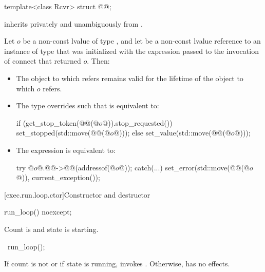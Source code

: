 \begin{itemdecl}
template<class Rcvr>
  struct @@;
\end{itemdecl}

\pnum
{}
inherits privately and unambiguously from .

\pnum
Let $o$ be a non-const lvalue of type ,
and let  be a non-const lvalue reference to an instance of type 
that was initialized with the expression 
passed to the invocation of connect that returned $o$.
Then:
\begin{itemize}
\item
The object to which  refers
remains valid for the lifetime of the object to which $o$ refers.
\item
The type  overrides
such that  is equivalent to:
\begin{codeblock}
if (get_stop_token(@@(@$o$@)).stop_requested()) {
  set_stopped(std::move(@@(@$o$@)));
} else {
  set_value(std::move(@@(@$o$@)));
}
\end{codeblock}
\item
The expression  is equivalent to:
\begin{codeblock}
try {
  @$o$@.@@->@@(addressof(@$o$@));
} catch(...) {
  set_error(std::move(@@(@$o$@)), current_exception());
}
\end{codeblock}
\end{itemize}

[exec.run.loop.ctor]{Constructor and destructor}

%
\begin{itemdecl}
run_loop() noexcept;
\end{itemdecl}

\begin{itemdescr}
\pnum
\ensures
Count is  and state is starting.
\end{itemdescr}

%
\begin{itemdecl}
~run_loop();
\end{itemdecl}

\begin{itemdescr}
\pnum
\effects
If count is not  or if state is running,
invokes .
Otherwise, has no effects.
\end{itemdescr}


